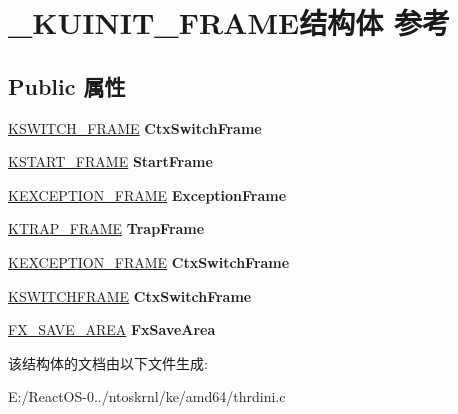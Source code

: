 \hypertarget{struct___k_u_i_n_i_t___f_r_a_m_e}{}\section{\+\_\+\+K\+U\+I\+N\+I\+T\+\_\+\+F\+R\+A\+M\+E结构体 参考}
\label{struct___k_u_i_n_i_t___f_r_a_m_e}
\subsection*{Public 属性}
\begin{DoxyCompactItemize}
\item 
\mbox{\label{struct___k_u_i_n_i_t___f_r_a_m_e_a4bcf6a8269c2a59b8cd9c66c6b8ee78e}} 
\hyperlink{struct___k_s_w_i_t_c_h___f_r_a_m_e}{K\+S\+W\+I\+T\+C\+H\+\_\+\+F\+R\+A\+ME} {\bfseries Ctx\+Switch\+Frame}
\item 
\mbox{\label{struct___k_u_i_n_i_t___f_r_a_m_e_a3936e574445258e4d43f73123b34e8e5}} 
\hyperlink{struct___k_s_t_a_r_t___f_r_a_m_e}{K\+S\+T\+A\+R\+T\+\_\+\+F\+R\+A\+ME} {\bfseries Start\+Frame}
\item 
\mbox{\label{struct___k_u_i_n_i_t___f_r_a_m_e_a77fb2b49924bd37486f3f9f10854137b}} 
\hyperlink{struct___k_e_x_c_e_p_t_i_o_n___f_r_a_m_e}{K\+E\+X\+C\+E\+P\+T\+I\+O\+N\+\_\+\+F\+R\+A\+ME} {\bfseries Exception\+Frame}
\item 
\mbox{\label{struct___k_u_i_n_i_t___f_r_a_m_e_a009d6a59bc789dccd28d4a63bc5bd497}} 
\hyperlink{struct___k_t_r_a_p___f_r_a_m_e}{K\+T\+R\+A\+P\+\_\+\+F\+R\+A\+ME} {\bfseries Trap\+Frame}
\item 
\mbox{\label{struct___k_u_i_n_i_t___f_r_a_m_e_a5fd96d01142061e4b87791b0d4ac1f05}} 
\hyperlink{struct___k_e_x_c_e_p_t_i_o_n___f_r_a_m_e}{K\+E\+X\+C\+E\+P\+T\+I\+O\+N\+\_\+\+F\+R\+A\+ME} {\bfseries Ctx\+Switch\+Frame}
\item 
\mbox{\label{struct___k_u_i_n_i_t___f_r_a_m_e_a4bcf6a8269c2a59b8cd9c66c6b8ee78e}} 
\hyperlink{struct___k_s_w_i_t_c_h_f_r_a_m_e}{K\+S\+W\+I\+T\+C\+H\+F\+R\+A\+ME} {\bfseries Ctx\+Switch\+Frame}
\item 
\mbox{\label{struct___k_u_i_n_i_t___f_r_a_m_e_a4ce354ac3178f15e91c398f7ae7804f5}} 
\hyperlink{struct___f_x___s_a_v_e___a_r_e_a}{F\+X\+\_\+\+S\+A\+V\+E\+\_\+\+A\+R\+EA} {\bfseries Fx\+Save\+Area}
\end{DoxyCompactItemize}


该结构体的文档由以下文件生成\+:\begin{DoxyCompactItemize}
\item 
E\+:/\+React\+O\+S-\/0../ntoskrnl/ke/amd64/thrdini.\+c\end{DoxyCompactItemize}
